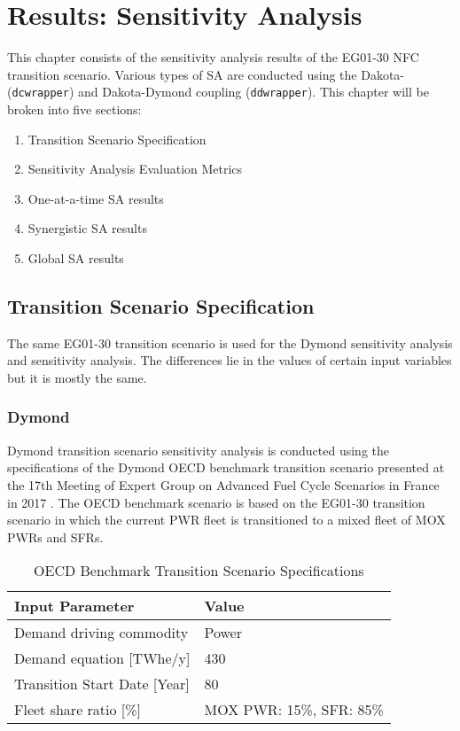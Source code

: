 \chapter{Results: Sensitivity Analysis}
This chapter consists of the sensitivity analysis results of the 
EG01-30 \gls{NFC} transition scenario. 
Various types of \gls{SA} are conducted
using the Dakota-\Cyclus (\texttt{dcwrapper}) 
and Dakota-Dymond coupling (\texttt{ddwrapper}). 
This chapter will be broken into five sections: 
\begin{enumerate}
    \item Transition Scenario Specification 
    \item Sensitivity Analysis Evaluation Metrics 
    \item One-at-a-time \gls{SA} results 
    \item Synergistic \gls{SA} results
    \item Global \gls{SA} results 
\end{enumerate}

\section{Transition Scenario Specification}
The same EG01-30 transition scenario is used for the Dymond 
sensitivity analysis and \Cyclus sensitivity analysis. 
The differences lie in the values of certain input variables but 
it is mostly the same. 

\subsection{Dymond}
Dymond transition scenario sensitivity analysis is conducted 
using the specifications of the Dymond OECD benchmark transition 
scenario presented at the 17th Meeting of Expert Group on Advanced 
Fuel Cycle Scenarios in France in 2017 
\cite{oecd_nuclear_energy_agency_wpfc_nodate}. 
The OECD benchmark scenario is based on the EG01-30 transition scenario in which 
the current \gls{PWR} fleet is transitioned to
a mixed fleet of \gls{MOX} \glspl{PWR} and \glspl{SFR}. 


\begin{table}[H]
    \caption{OECD Benchmark Transition Scenario
	Specifications \cite{oecd_nuclear_energy_agency_wpfc_nodate}}
	\label{tab:dymondinputs}
    \footnotesize
    \begin{tabularx}{\textwidth}{LL}
    \hline
                               \textbf{Input Parameter}            & \textbf{Value}            \\ \hline
    Demand driving commodity   & Power              \\
                               Demand equation {[}TWhe/y{]}   & 430        \\
                               Transition Start Date [Year] & 80\\ 
                               Fleet share ratio [\%] & \gls{MOX} \gls{PWR}: 15\%, \gls{SFR}: 85\%\\ \hline
    \end{tabularx}%
    \end{table}


